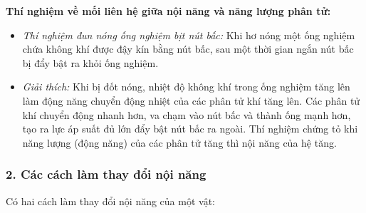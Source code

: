 \begin{hoatdong}
\textbf{Thí nghiệm về mối liên hệ giữa nội năng và năng lượng phân tử:}
\begin{itemize}
    \item \textit{Thí nghiệm đun nóng ống nghiệm bịt nút bấc:} Khi hơ nóng một ống nghiệm chứa không khí được đậy kín bằng nút bấc, sau một thời gian ngắn nút bấc bị đẩy bật ra khỏi ống nghiệm.
    \item \textit{Giải thích:} Khi bị đốt nóng, nhiệt độ không khí trong ống nghiệm tăng lên làm động năng chuyển động nhiệt của các phân tử khí tăng lên. Các phân tử khí chuyển động nhanh hơn, va chạm vào nút bấc và thành ống mạnh hơn, tạo ra lực áp suất đủ lớn đẩy bật nút bấc ra ngoài. Thí nghiệm chứng tỏ khi năng lượng (động năng) của các phân tử tăng thì nội năng của hệ tăng.
\end{itemize}
\end{hoatdong}

\subsubsection{2. Các cách làm thay đổi nội năng}
Có hai cách làm thay đổi nội năng của một vật:

